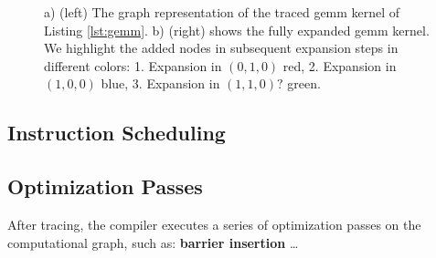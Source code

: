 \documentclass{article}
\begin{document}
\begin{figure*}
    \caption{a) (left) The graph representation of the traced gemm kernel of Listing \ref{lst:gemm}. b) (right) shows the fully expanded gemm kernel. We highlight the added nodes in subsequent expansion steps in different colors: 1. Expansion in $(0,1,0)$ {\color{red!100}red}, 2. Expansion in $(1,0,0)$ {\color{blue!100}blue}, 3. Expansion in $(1,1,0)?$ {\color{green!100}green}.}
    \label{fig:enter-label}
\end{figure*}



\subsection{Instruction Scheduling}


\subsection{Optimization Passes}
After tracing, the compiler executes a series of optimization passes on the computational graph, such as:
\textbf{barrier insertion} %
\ldots
\end{document}
